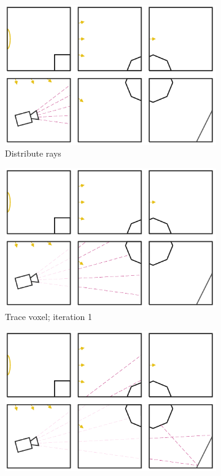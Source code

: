 \begin{figure}[!htb]
\centering
\begin{subfigure}{.49\columnwidth}
 \centering
  \includegraphics[width=.98\columnwidth]{drawings/Trace1.pdf}
  \caption{Distribute rays}
\end{subfigure}
\begin{subfigure}{.49\columnwidth}
 \centering
  \includegraphics[width=.98\columnwidth]{drawings/Trace2.pdf}
  \caption{Trace voxel; iteration 1}
\end{subfigure}
\begin{subfigure}{.49\columnwidth}
 \centering
  \includegraphics[width=.98\columnwidth]{drawings/Trace3.pdf}

\end{subfigure}
\end{figure}
